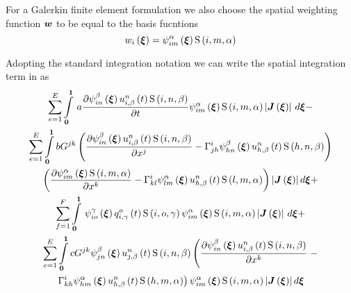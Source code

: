 For a Galerkin finite element formulation we also choose the spatial weighting
function $\vect{w}$ to be equal to the basis fucntions \ie
\begin{equation}
  \fnof{w_{i}}{\vect{\xi}}=\idxgbfn{i}{m}{\alpha}{\vect{\xi}}\idxgsf{i}{m}{\alpha}
\end{equation}


Adopting the standard integration notation we can write the spatial
integration term in  as
\begin{multline}
  \dsum_{e=1}^{E}\gint{\vect{0}}{\vect{1}}{a\delby{\idxgbfn{i}{n}{\beta}{\vect{\xi}}
      \fnof{\idxnodedof{u}{i}{n}{\beta}}{t}\idxgsf{i}{n}{\beta}}{t}
    \idxgbfn{i}{m}{\alpha}{\vect{\xi}}\idxgsf{i}{m}{\alpha}
    \abs{\fnof{\matr{J}}{\vect{\xi}}}}{\vect{\xi}}- \\
  \dsum_{e=1}^{E}\dintl{\vect{0}}{\vect{1}}bG^{jk}\pbrac{\delby{\idxgbfn{i}{n}{\beta}{\vect{\xi}}
        \fnof{\idxnodedof{u}{i}{n}{\beta}}{t}\idxgsf{i}{n}{\beta}}{x^{j}}-
      \christoffel{i}{j}{h}\idxgbfn{h}{n}{\beta}{\vect{\xi}}
      \fnof{\idxnodedof{u}{h}{n}{\beta}}{t}\idxgsf{h}{n}{\beta}} \\
    \pbrac{\delby{\idxgbfn{i}{m}{\alpha}{\vect{\xi}}\idxgsf{i}{m}{\alpha}}{x^{k}}-
      \christoffel{i}{k}{l}\idxgbfn{l}{m}{\alpha}{\vect{\xi}}
      \fnof{\idxnodedof{u}{h}{n}{\beta}}{t}
      \idxgsf{l}{m}{\alpha}}\abs{\fnof{\matr{J}}{\vect{\xi}}}d\vect{\xi} + \\
  \dsum_{f=1}^{F}\gint{\vect{0}}{\vect{1}}{\idxgbfn{i}{o}{\gamma}{\vect{\xi}}
    \fnof{\idxnodedof{q}{i}{o}{\gamma}}{t}\idxgsf{i}{o}{\gamma}
    \idxgbfn{i}{m}{\alpha}{\vect{\xi}}\idxgsf{i}{m}{\alpha}
    \abs{\fnof{\matr{J}}{\vect{\xi}}}}{\vect{\xi}} + \\
  \dsum_{e=1}^{E}\dintl{\vect{0}}{\vect{1}}cG^{jk}\idxgbfn{j}{n}{\beta}{\vect{\xi}}
  \fnof{\idxnodedof{u}{j}{n}{\beta}}{t}\idxgsf{i}{n}{\beta}
  \pbracr{\delby{\idxgbfn{i}{n}{\beta}{\vect{\xi}}\fnof{\idxnodedof{u}{i}{n}{\beta}}{t}
      \idxgsf{i}{n}{\beta}}{x^{k}}}- \\
    \pbracl{\christoffel{i}{k}{h}\idxgbfn{h}{m}{\alpha}{\vect{\xi}}
    \fnof{\idxnodedof{u}{h}{n}{\beta}}{t}\idxgsf{h}{m}{\alpha}}
  \idxgbfn{i}{m}{\alpha}{\vect{\xi}}\idxgsf{i}{m}{\alpha}
  \abs{\fnof{\matr{J}}{\vect{\xi}}}d\vect{\xi}
  \label{eqn:Burgersfemform}
\end{multline}


